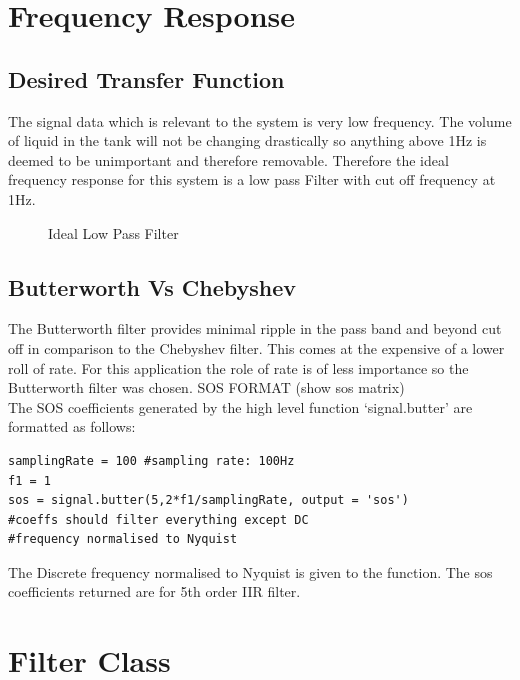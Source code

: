 \documentclass{article}
\begin{document}
\section{Frequency Response}
\subsection{Desired Transfer Function}
The signal data which is relevant to the system is very low frequency. The volume of liquid in the tank will not be changing drastically so anything above 1Hz is deemed to be unimportant and therefore removable. Therefore the ideal frequency response for this system is a low pass Filter with cut off frequency at 1Hz.
\begin{figure}[H]
    \centering
    
    \caption{Ideal Low Pass Filter}
    \label{fig:lowpass}
\end{figure}

\subsection{Butterworth Vs Chebyshev}
The Butterworth filter provides minimal ripple in the pass band and beyond cut off in comparison to the Chebyshev filter. This comes at the expensive of a lower roll of rate. For this application the role of rate is of less importance so the Butterworth filter was chosen. 
\newline
\newline
SOS FORMAT (show sos matrix)\\
\newline
The SOS coefficients generated by the high level function `signal.butter' are formatted as follows:

\lstset{language=Python}
\begin{lstlisting}
samplingRate = 100 #sampling rate: 100Hz
f1 = 1
sos = signal.butter(5,2*f1/samplingRate, output = 'sos')
#coeffs should filter everything except DC
#frequency normalised to Nyquist
\end{lstlisting}
The Discrete frequency normalised to Nyquist is given to the function. The sos coefficients returned are for 5th order IIR filter. 

\section{Filter Class}
\end{document}
